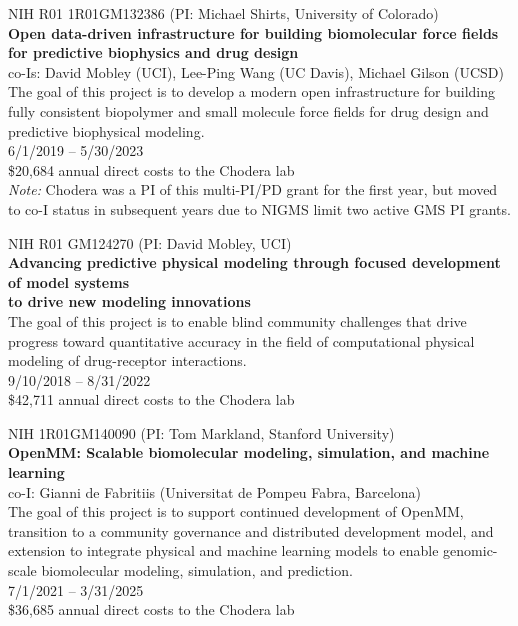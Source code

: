 \documentclass[10pt]{article}
\begin{document}
NIH R01 1R01GM132386 (PI: Michael Shirts, University of Colorado) \\
{\bf Open data-driven infrastructure for building biomolecular force fields for predictive biophysics and drug design} \\
co-Is: David Mobley (UCI), Lee-Ping Wang (UC Davis), Michael Gilson (UCSD) \\
The goal of this project is to develop a modern open infrastructure for building fully consistent biopolymer and small molecule force fields for drug design and predictive biophysical modeling. \\
6/1/2019 -- 5/30/2023 \\
\$20,684 annual direct costs to the Chodera lab\\
\emph{Note:} Chodera was a PI of this multi-PI/PD grant for the first year, but moved to co-I status in subsequent years due to NIGMS limit two active GMS PI grants.

\vspace{1.5ex}

NIH R01 GM124270 (PI: David Mobley, UCI) \\
{\bf Advancing predictive physical modeling through focused development of model systems\\ to drive new modeling innovations}\\
The goal of this project is to enable blind community challenges that drive progress toward quantitative accuracy in the field of computational physical modeling of drug-receptor interactions.\\
9/10/2018 -- 8/31/2022\\
\$42,711 annual direct costs to the Chodera lab

\vspace{1.5ex}

NIH 1R01GM140090 (PI: Tom Markland, Stanford University)\\
{\bf OpenMM: Scalable biomolecular modeling, simulation, and machine learning}\\
co-I: Gianni de Fabritiis (Universitat de Pompeu Fabra, Barcelona)\\
The goal of this project is to support continued development of OpenMM, transition to a community governance and distributed development model, and extension to integrate physical and machine learning models to enable genomic-scale biomolecular modeling, simulation, and prediction.\\
7/1/2021 -- 3/31/2025\\
\$36,685 annual direct costs to the Chodera lab
\end{document}

